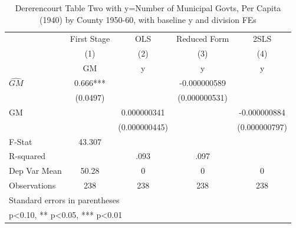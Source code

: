\begin{table}[htbp]\centering
\def\sym#1{\ifmmode^{#1}\else\(^{#1}\)\fi}
\caption{Dererencourt Table Two with y=Number of Municipal Govts, Per Capita (1940) by County 1950-60, with baseline y and division FEs}
\begin{tabular}{l*{4}{c}}
\toprule
                    & First Stage   &         OLS   &Reduced Form   &        2SLS   \\
                    &\multicolumn{1}{c}{(1)}&\multicolumn{1}{c}{(2)}&\multicolumn{1}{c}{(3)}&\multicolumn{1}{c}{(4)}\\
                    &\multicolumn{1}{c}{GM}&\multicolumn{1}{c}{y}&\multicolumn{1}{c}{y}&\multicolumn{1}{c}{y}\\
\midrule
$\hat{GM}$          &       0.666***&               &-0.000000589   &               \\
                    &    (0.0497)   &               &(0.000000531)   &               \\
\addlinespace
GM                  &               & 0.000000341   &               &-0.000000884   \\
                    &               &(0.000000445)   &               &(0.000000797)   \\
\midrule
F-Stat              &      43.307   &               &               &               \\
R-squared           &               &        .093   &        .097   &               \\
Dep Var Mean        &       50.28   &           0   &           0   &           0   \\
Observations        &         238   &         238   &         238   &         238   \\
\bottomrule
\multicolumn{5}{l}{\footnotesize Standard errors in parentheses}\\
\multicolumn{5}{l}{\footnotesize * p<0.10, ** p<0.05, *** p<0.01}\\
\end{tabular}
\end{table}
